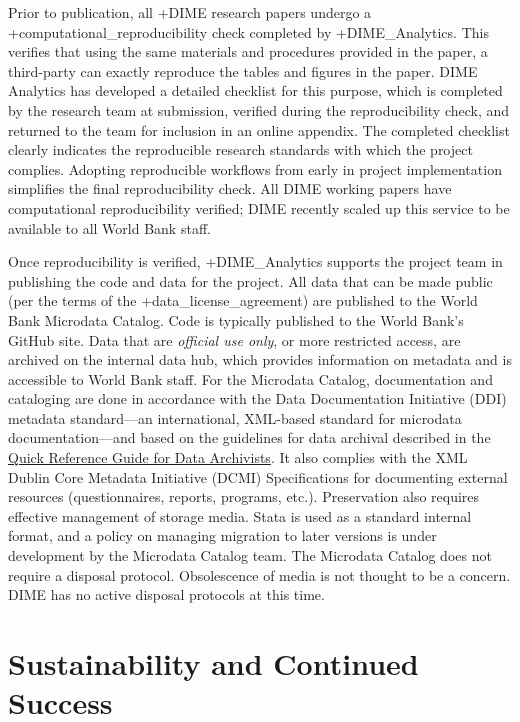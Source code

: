 \documentclass[
]{book}
\begin{document}
Prior to publication, all +DIME\textbar{} research papers undergo a +computational\_reproducibility\textbar{} check completed by +DIME\_Analytics\textbar. This verifies that using the same materials and procedures provided in the paper, a third-party can exactly reproduce the tables and figures in the paper. DIME Analytics has developed a detailed checklist for this purpose, which is completed by the research team at submission, verified during the reproducibility check, and returned to the team for inclusion in an online appendix. The completed checklist clearly indicates the reproducible research standards with which the project complies. Adopting reproducible workflows from early in project implementation simplifies the final reproducibility check. All DIME working papers have computational reproducibility verified; DIME recently scaled up this service to be available to all World Bank staff.

Once reproducibility is verified, +DIME\_Analytics\textbar{} supports the project team in publishing the code and data for the project. All data that can be made public (per the terms of the +data\_license\_agreement\textbar) are published to the World Bank Microdata Catalog. Code is typically published to the World Bank's GitHub site. Data that are \emph{official use only}, or more restricted access, are archived on the internal data hub, which provides information on metadata and is accessible to World Bank staff. For the Microdata Catalog, documentation and cataloging are done in accordance with the Data Documentation Initiative (DDI) metadata standard---an international, XML-based standard for microdata documentation---and based on the guidelines for data archival described in the \href{https://guide-for-data-archivists.readthedocs.io/en/latest/}{Quick Reference Guide for Data Archivists}. It also complies with the XML Dublin Core Metadata Initiative (DCMI) Specifications for documenting external resources (questionnaires, reports, programs, etc.). Preservation also requires effective management of storage media. Stata is used as a standard internal format, and a policy on managing migration to later versions is under development by the Microdata Catalog team. The Microdata Catalog does not require a disposal protocol. Obsolescence of media is not thought to be a concern. DIME has no active disposal protocols at this time.

\hypertarget{sustainability-and-continued-success-7}{%
\section{Sustainability and Continued Success}\label{sustainability-and-continued-success-7}}
\end{document}

